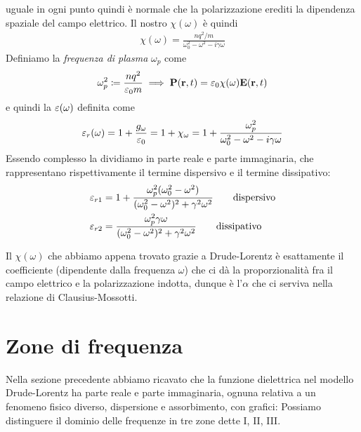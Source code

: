 uguale in ogni punto quindi è normale che la polarizzazione erediti la dipendenza spaziale del campo elettrico. Il nostro $ \chi(\omega) $ è quindi
\begin{align}
  \chi(\omega) = \frac{n q^2 /m}{\omega_0^2 - \omega^2 - i \gamma \omega}
\end{align}
Definiamo la \textit{frequenza di plasma} $ \omega_p $ come
\begin{align}
  \omega^2_p \coloneq \frac{n q^2}{\varepsilon_0 m} \implies \mathbf{P}(\mathbf{r}, t) = \varepsilon_0 \chi(\omega )\mathbf{E}(\mathbf{r}, t)
\end{align}
e quindi la $ \varepsilon(\omega) $ definita come 
\begin{align}
  \varepsilon_r(\omega) = 1 + \frac{g_\omega}{\varepsilon_0} = 1 + \chi_\omega = 1 + \frac{\omega_p^2}{\omega_0^2 - \omega^2 - i \gamma \omega}
\end{align}
Essendo complesso la dividiamo in parte reale e parte immaginaria, che rappresentano rispettivamente il termine dispersivo e il termine dissipativo:
\begin{align}
  \varepsilon_{r1} &= 1 + \frac{\omega_p^2 (\omega_0^2 - \omega^2) }{(\omega_0^2 - \omega^2)^2 + \gamma^2 \omega^2}  \tag*{dispersivo}
  \\
  \varepsilon_{r2} &= \frac{\omega_p^2 \gamma \omega }{(\omega_0^2 - \omega^2)^2 + \gamma^2 \omega^2} \tag*{dissipativo}
\end{align}



Il $ \chi(\omega) $ che abbiamo appena trovato grazie a Drude-Lorentz è esattamente il coefficiente (dipendente dalla frequenza $\omega$) che ci dà la 
proporzionalità fra il campo elettrico e la polarizzazione indotta, dunque è l'$\alpha$ che ci serviva nella relazione di Clausius-Mossotti.

\section{Zone di frequenza} %
Nella sezione precedente abbiamo ricavato che la funzione dielettrica nel modello Drude-Lorentz ha parte reale e parte immaginaria, ognuna relativa 
a un fenomeno fisico diverso, dispersione e assorbimento, con grafici:
Possiamo distinguere il dominio delle frequenze in tre zone dette I, II, III.

